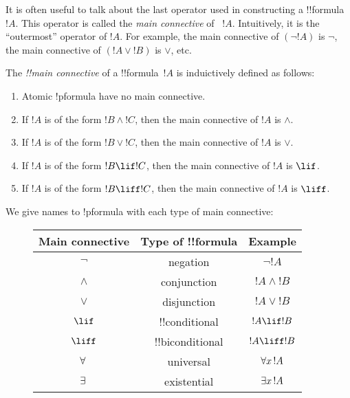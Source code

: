 \documentclass[../../include/open-logic-section]{subfiles}
\begin{document}


\begin{explain}
It is often useful to talk about the last operator used in
constructing a !!{formula}~$!A$.  This operator is called the \emph{main
  connective} of ~$!A$. Intuitively, it is the ``outermost'' operator
of $!A$. For example, the main connective of $(\lnot !A)$ is $\lnot$,
the main connective of $(!A \lor !B)$ is $\lor$, etc.
\end{explain}


\begin{defn}
The \emph{!!{main connective}} of a !!{formula}~$!A$ is induictively
defined as follows:
\begin{enumerate}
\item Atomic !p{formula} have no main connective.
\item If $!A$ is of the form $!B \land !C$, then the main connective of
  $!A$ is $\land$.
\item If $!A$ is of the form $!B \lor !C$, then the main connective of
  $!A$ is $\lor$.
\item If $!A$ is of the form $!B \lif !C$, then the main connective of
  $!A$ is $\lif$.
\item If $!A$ is of the form $!B \liff !C$, then the main connective of
  $!A$ is $\liff$.
\end{enumerate}
\end{defn}

We give names to !p{formula} with each type of main connective:

\begin{figure}[!h]
\centering
\begin{tabular}{| c | c | c |}
\hline
Main connective & Type of !!{formula} & Example\\
\hline
$\lnot$ & negation & $\lnot !A$ \\
$\land$ & conjunction & $!A \land !B$ \\
$\lor$ & disjunction & $!A \lor !B$ \\
$\lif$ & !!{conditional} & $!A \lif !B$ \\
$\liff$ & !!{biconditional} & $!A \liff !B$ \\
$\lforall[][]$ & universal & $\lforall[x][!A]$ \\
$\lexists[][]$ & existential & $\lexists[x][!A]$\\ \hline
\end{tabular}
\end{figure}
\end{document}
